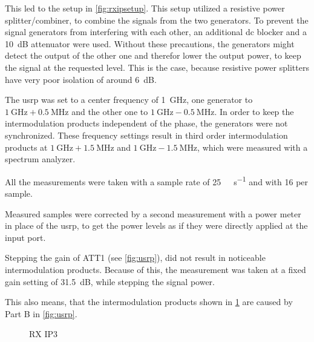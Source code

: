 \documentclass[12pt,a4paper,parskip=full,abstracton]{scrartcl}
\begin{document}
This led to the setup in \cref{fig:rxipsetup}. This setup utilized a resistive power
splitter/combiner, to combine the signals from the two generators. To prevent the signal
generators from interfering with each other, an additional \gls{dc} blocker and a
\SI{10}{\deci\bel} attenuator were used. Without these precautions, the generators
might detect the output of the other one and therefor lower the output power, to keep
the signal at the requested level. This is the case, because resistive power splitters
have very poor isolation of around \SI{6}{\deci\bel}.

The \gls{usrp} was set to a center frequency of \SI{1}{\giga\hertz}, one generator
to $\SI{1}{\giga\hertz} + \SI{0.5}{\mega\hertz}$ and the other one to $\SI{1}{\giga\hertz}
- \SI{0.5}{\mega\hertz}$. In order to keep the intermodulation products independent of the
phase, the generators were not synchronized. These frequency settings result in third order
intermodulation products at $\SI{1}{\giga\hertz} + \SI{1.5}{\mega\hertz}$ and
$\SI{1}{\giga\hertz} - \SI{1.5}{\mega\hertz}$, which were measured with a spectrum analyzer.

All the measurements were taken with a sample rate of \SI{25}{\mega\samples\per\second}
and with \SI{16}{\bit} per sample.

Measured samples were corrected by a second measurement with a power meter in place of the
\gls{usrp}, to get the power levels as if they were directly applied at the input port.

Stepping the gain of ATT1 (see \cref{fig:usrp}), did not result in noticeable
intermodulation products. Because of this, the measurement was taken at a fixed
gain setting of \SI{31.5}{\deci\bel}, while stepping the signal power.

This also means, that the intermodulation products shown in \cref{fig:rxip3} are
caused by Part B in \cref{fig:usrp}.

\begin{figure}[htb]
    \centering
{}
    \caption{RX IP3}
    \label{fig:rxip3}
\end{figure}
\end{document}
